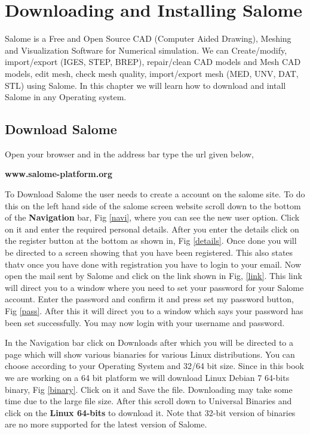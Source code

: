 \chapter{Downloading and Installing Salome}
\thispagestyle{empty}
\label{sec:chap10}
\newcommand{\LocCHtenfig}{\Origin/CHAPTERS/chap10/figures}

Salome is a Free and Open Source  CAD (Computer Aided Drawing), Meshing and Visualization Software for Numerical simulation. 
We can Create/modify, import/export (IGES, STEP, BREP), repair/clean CAD models and Mesh CAD models, edit mesh, check mesh quality, 
import/export mesh (MED, UNV, DAT, STL) using Salome. In this chapter we will learn how to download and intall Salome in any Operating system.

\section{Download Salome}

Open your browser and in the address bar type the url given below, \newline

\centering \textbf{www.salome-platform.org} \newline

\flushleft To Download Salome the user needs to create a account on the salome site. To do this on the left hand side of the salome screen website
scroll down to the bottom of the \textbf{Navigation} bar, Fig \ref{navi}, where you can see the new user option. Click on it and enter the required
personal details. \newline
\flushleft After you enter the details click on the register button at the bottom as shown in, Fig \ref{details}. Once done you will be directed 
to a screen showing that you have been registered. This also states thatv once you have done with registration you have to login to your email. Now 
open the mail sent by Salome and click on the link shown in Fig, \ref{link}. This link will direct you to a window where you need to set your password
for your Salome account. Enter the password and confirm it and press set my password button, Fig \ref{pass}. After this it will direct you to a window
which says your password has been set successfully. You may now login with your username and password. \newline

\flushleft In the Navigation bar click on Downloads after which you will be directed to a page which will show various bianaries for various Linux
distributions. You can choose according to your Operating System and 32/64 bit size. Since in this book we are working on a 64 bit platform we
will download Linux Debian 7 64-bits binary, Fig \ref{binary}. Click on it and Save the file. Downloading may take some time due to the large file size.
After this scroll down to Universal Binaries and click on the \textbf{Linux 64-bits} to download it. Note that 32-bit version of binaries are no
more supported for the latest version of Salome. \newline

